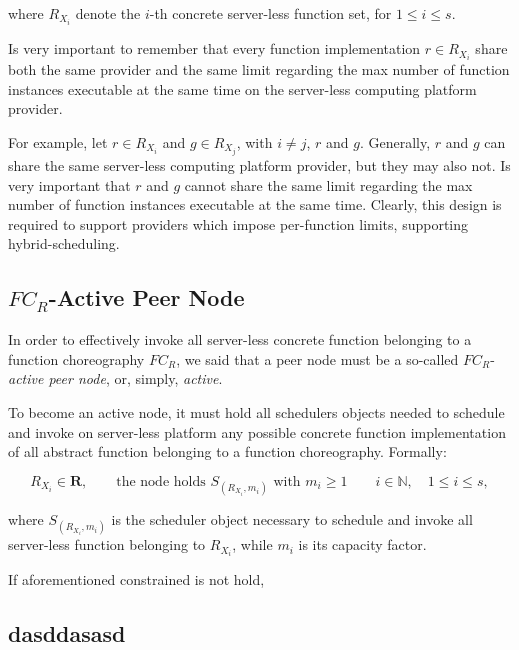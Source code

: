 \documentclass[10pt,a4paper]{article}
\begin{document}
where $R_{{X}_{i}}$ denote the $i$-th concrete server-less function set, for $1 \leq i \leq s$.

Is very important to remember that every function implementation $r \in R_{{X}_{i}}$ share both the same provider and the same limit regarding the max number of function instances executable at the same time on the server-less computing platform provider.  

For example, let $r \in R_{{X}_{i}}$ and $g \in R_{{X}_{j}}$, with $i \neq j$, $r$ and $g$. Generally, $r$ and $g$ can share the same server-less computing platform provider, but they may also not. Is very important that $r$ and $g$ cannot share the same limit regarding the max number of function instances executable at the same time. Clearly, this design is required to support providers which impose per-function limits, supporting hybrid-scheduling.

\subsection{$FC_R$-Active Peer Node}

In order to effectively invoke all server-less concrete function belonging to a function choreography $FC_R$, we said that a peer node must be a so-called $FC_R$-\textit{active peer node}, or, simply, \textit{active}.

To become an active node, it must hold all schedulers objects needed to schedule and invoke on server-less platform any possible concrete function implementation of all abstract function belonging to a function choreography. Formally:

\begin{equation}
R_{{X}_{i}} \in \textbf{R},  \qquad \text{the node holds } S_{({R_{X_i}},m_i)} \text{ with } m_i \geqslant 1 \qquad i \in \mathbb{N},\quad 1 \leq i \leq s, 
\end{equation}

where $S_{({R_{X_i}},m_i)}$ is the scheduler object necessary to schedule and invoke all server-less function belonging to $R_{X_i}$, while $m_i$ is its capacity factor. 

If aforementioned constrained is not hold, 

\subsection{dasddasasd}
\end{document}
